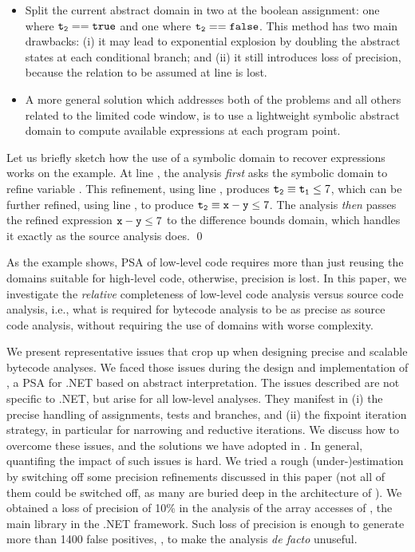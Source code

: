 \documentclass{llncs}
\begin{document}
\begin{example}
\begin{itemize}
\item Split the current abstract domain in two at the boolean
assignment: one where $\mathtt{t_2} == \mathtt{true}$ and one where
$\mathtt{t_2} == \mathtt{false}$.  This method has two main drawbacks: (i)
it may lead to exponential explosion by doubling the abstract states
at each conditional branch; and (ii) it still introduces loss of
precision, because the relation to be assumed at line  is
lost.

\item 
A more general solution which addresses both of the problems and all
others related to the limited code window, is to use a
lightweight symbolic abstract domain to compute available
expressions at each program point. 
\end{itemize}
\vspace{-3pt}
Let us briefly sketch how the use of a symbolic domain to recover
expressions works on the example.  At line , the analysis
\emph{first} asks the symbolic domain to refine variable .
This refinement, using line , produces $\mathtt{t_2} \equiv
\mathtt{t_1} \leq 7$, which can be further refined, using line ,
to produce $\mathtt{t_2} \equiv \mathtt{x} - \mathtt{y} \leq 7$.  The
analysis \emph{then} passes the refined expression $\mathtt{x} -
\mathtt{y} \leq 7$ to the difference bounds domain, which handles it
exactly as the source analysis does.  \qed
\end{example}

\vspace*{-5pt}
As the example shows, PSA of low-level code requires more than just
reusing the domains suitable for high-level code, otherwise, precision
is lost. In this paper, we investigate the \emph{relative}
completeness of low-level code analysis versus source code
analysis, i.e., what is required for bytecode analysis to be as
precise as source code analysis, without requiring the use of domains
with worse complexity.

We present representative issues that crop up when designing precise
and scalable bytecode analyses. We faced those issues during the
design and implementation of \Clousot{} \cite{LogozzoMaf08}, a PSA for .NET based on
abstract interpretation.  The issues described are not specific to
.NET, but arise for all low-level analyses. They manifest in (i) the
precise handling of assignments, tests and branches, and (ii) the
fixpoint iteration strategy, in particular for narrowing and reductive
iterations.  We discuss how to overcome these issues, and the
solutions we have adopted in \Clousot{}.
In general, quantifing the impact of such issues is hard.
We tried a rough (under-)estimation by switching off some precision refinements discussed in this paper (not all of them could be switched off, as many are buried deep in the architecture of \Clousot{}).  
We obtained a loss of precision of 10\% in the analysis of the array accesses of , the main library in the .NET framework.
Such loss of precision is enough to generate more than 1400 false positives, \ie, to make the analysis \emph{de facto} unuseful.
\end{document}

